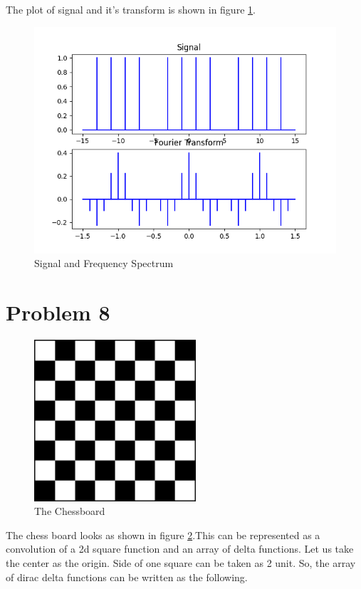 \documentclass[a4paper,11pt]{article}
\begin{document}
The plot of signal and it's transform is shown in figure \ref{fig:org3b5b9f1}.

\begin{figure}[htbp]
\centering
\includegraphics[width=.9\linewidth]{Pr7_Signal_Transform.png}
\caption{\label{fig:org3b5b9f1}Signal and Frequency Spectrum}
\end{figure}
\newpage
\section*{Problem 8}
\label{sec:org7246eb5}

\begin{figure}[htbp]
\centering
\includegraphics[width=6cm]{Chess_Board.png}
\caption{\label{fig:org4aab790}The Chessboard}
\end{figure}

The chess board looks as shown in figure \ref{fig:org4aab790}.This can be represented as a convolution of a 2d square function and an array of delta functions. Let us take the center as the origin. Side of one square can be taken as 2 unit. So, the array of dirac delta functions can be written as the following.
\end{document}
